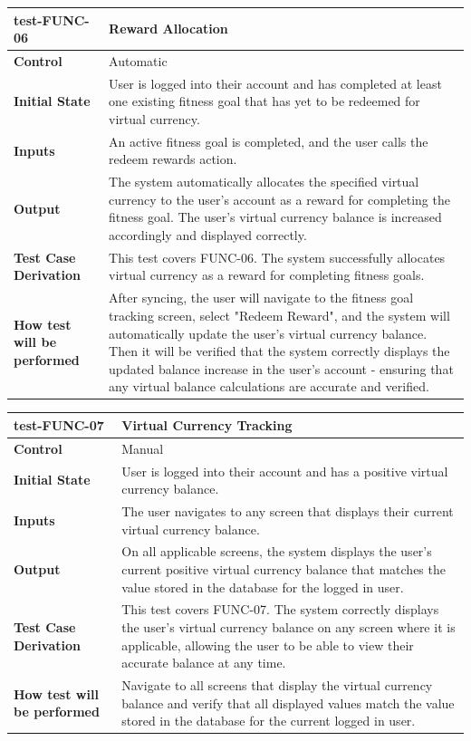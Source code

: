 \documentclass[12pt, titlepage]{article}
\begin{document}
\noindent\begin{tabularx}{\textwidth}{>{\raggedright\arraybackslash}p{3.5cm}X}
  \toprule
  \textbf{test-FUNC-06} & \textbf{Reward Allocation}\\
  \midrule
  \textbf{Control} & Automatic\\
  \textbf{Initial State} & User is logged into their account and has completed at least one existing fitness goal that has yet to be redeemed for virtual currency.\\
  \textbf{Inputs} & An active fitness goal is completed, and the user calls the redeem rewards action.\\
  \textbf{Output} & The system automatically allocates the specified virtual currency to the user's account as a reward for completing the fitness goal. The user's virtual currency balance is increased accordingly and displayed correctly.\\
  \textbf{Test Case Derivation} & This test covers FUNC-06. The system successfully allocates virtual currency as a reward for completing fitness goals.\\
  \textbf{How test will be performed} & After syncing, the user will navigate to the fitness goal tracking screen, select "Redeem Reward", and the system will automatically update the user's virtual currency balance. Then it will be verified that the system correctly displays the updated balance increase in the user's account - ensuring that any virtual balance calculations are accurate and verified.\\
  \bottomrule
\end{tabularx}

\vspace{1em}

\noindent\begin{tabularx}{\textwidth}{>{\raggedright\arraybackslash}p{3.5cm}X}
  \toprule
  \textbf{test-FUNC-07} & \textbf{Virtual Currency Tracking}\\
  \midrule
  \textbf{Control} & Manual\\
  \textbf{Initial State} & User is logged into their account and has a positive virtual currency balance.\\
  \textbf{Inputs} & The user navigates to any screen that displays their current virtual currency balance.\\
  \textbf{Output} & On all applicable screens, the system displays the user's current positive virtual currency balance that matches the value stored in the database for the logged in user.\\
  \textbf{Test Case Derivation} & This test covers FUNC-07. The system correctly displays the user's virtual currency balance on any screen where it is applicable, allowing the user to be able to view their accurate balance at any time.\\
  \textbf{How test will be performed} & Navigate to all screens that display the virtual currency balance and verify that all displayed values match the value stored in the database for the current logged in user.\\
  \bottomrule
\end{tabularx}
\end{document}
